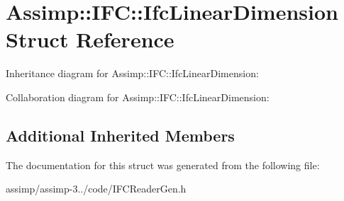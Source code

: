\hypertarget{struct_assimp_1_1_i_f_c_1_1_ifc_linear_dimension}{\section{Assimp\+:\+:I\+F\+C\+:\+:Ifc\+Linear\+Dimension Struct Reference}
\label{struct_assimp_1_1_i_f_c_1_1_ifc_linear_dimension}
}


Inheritance diagram for Assimp\+:\+:I\+F\+C\+:\+:Ifc\+Linear\+Dimension\+:


Collaboration diagram for Assimp\+:\+:I\+F\+C\+:\+:Ifc\+Linear\+Dimension\+:
\subsection*{Additional Inherited Members}


The documentation for this struct was generated from the following file\+:\begin{DoxyCompactItemize}
\item 
assimp/assimp-\/3../code/I\+F\+C\+Reader\+Gen.\+h\end{DoxyCompactItemize}
